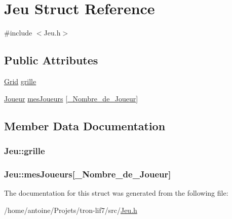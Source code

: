 \hypertarget{structJeu}{\section{Jeu Struct Reference}
\label{structJeu}
}


{\ttfamily \#include $<$Jeu.\-h$>$}

\subsection*{Public Attributes}
\begin{DoxyCompactItemize}
\item 
\hyperlink{structGrid}{Grid} \hyperlink{structJeu_a004d8d0f888b9dea26cbbc2d6afea6e7}{grille}
\item 
\hyperlink{structJoueur}{Joueur} \hyperlink{structJeu_aa6d723ce3faee960bc6f49a3e17fe9ad}{mes\-Joueurs} \mbox{[}\hyperlink{Constantes_8h_a505b3b803482fbd73a5eafac78db730f}{\-\_\-\-Nombre\-\_\-de\-\_\-\-Joueur}\mbox{]}
\end{DoxyCompactItemize}


\subsection{Member Data Documentation}
\hypertarget{structJeu_a004d8d0f888b9dea26cbbc2d6afea6e7}{
\subsubsection[{grille}]{ Jeu\-::grille}}\label{structJeu_a004d8d0f888b9dea26cbbc2d6afea6e7}
\hypertarget{structJeu_aa6d723ce3faee960bc6f49a3e17fe9ad}{
\subsubsection[{mes\-Joueurs}]{ Jeu\-::mes\-Joueurs\mbox{[}{\bf \-\_\-\-Nombre\-\_\-de\-\_\-\-Joueur}\mbox{]}}}\label{structJeu_aa6d723ce3faee960bc6f49a3e17fe9ad}


The documentation for this struct was generated from the following file\-:\begin{DoxyCompactItemize}
\item 
/home/antoine/\-Projets/tron-\/lif7/src/\hyperlink{Jeu_8h}{Jeu.\-h}\end{DoxyCompactItemize}
